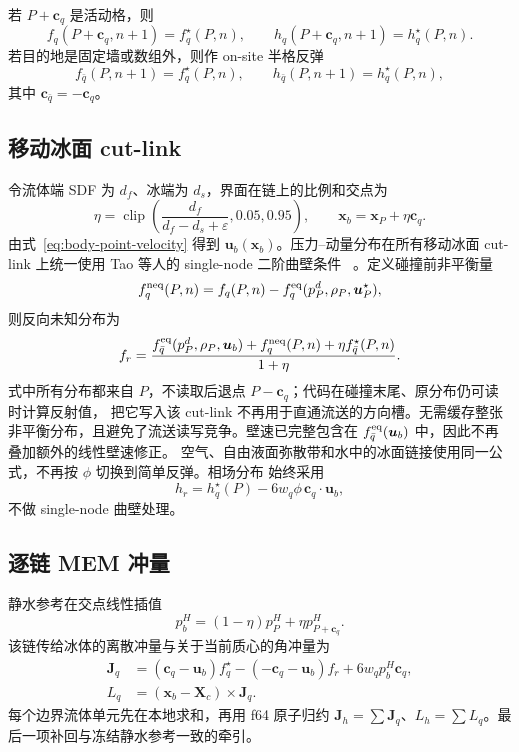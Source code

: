 \documentclass[UTF8,zihao=-4]{ctexart}
\newcommand{\vect}[1]{\boldsymbol{#1}}
\newcommand{\clip}{\operatorname{clip}}
\numberwithin{equation}{section}
\begin{document}
若 $P+\vect c_q$ 是活动格，则
\begin{equation}
  f_q(P+\vect c_q,n+1)=f_q^\star(P,n),
  \qquad h_q(P+\vect c_q,n+1)=h_q^\star(P,n).
\end{equation}
若目的地是固定墙或数组外，则作 on-site 半格反弹
\begin{equation}
  f_{\bar q}(P,n+1)=f_q^\star(P,n),
  \qquad h_{\bar q}(P,n+1)=h_q^\star(P,n),
\end{equation}
其中 $\vect c_{\bar q}=-\vect c_q$。

\subsection{移动冰面 cut-link}

令流体端 SDF 为 $d_f$、冰端为 $d_s$，界面在链上的比例和交点为
\begin{equation}
  \eta=\clip\left(\frac{d_f}{d_f-d_s+\varepsilon},0.05,0.95\right),
  \qquad \vect x_b=\vect x_P+\eta\vect c_q.
  \label{eq:cut-location}
\end{equation}
由式~\eqref{eq:body-point-velocity} 得到 $\vect u_b(\vect x_b)$。压力--动量分布在所有移动冰面
cut-link 上统一使用 Tao 等人的 single-node 二阶曲壁条件
~\cite{tao2018}。定义碰撞前非平衡量
\begin{equation}
  f_q^{\rm neq}(P,n)=f_q(P,n)-f_q^{\rm eq}(p^d_P,\rho_P,\vect u_P^\star),
\end{equation}
则反向未知分布为
\begin{equation}
  f_r=\frac{f_{\bar q}^{\rm eq}(p^d_P,\rho_P,\vect u_b)
  +f_q^{\rm neq}(P,n)+\eta f_{\bar q}^\star(P,n)}{1+\eta}.
  \label{eq:single-node-cut-link}
\end{equation}
式中所有分布都来自 $P$，不读取后退点 $P-\vect c_q$；代码在碰撞末尾、原分布仍可读时计算反射值，
把它写入该 cut-link 不再用于直通流送的方向槽。无需缓存整张非平衡分布，且避免了流送读写竞争。壁速已完整包含在
$f_{\bar q}^{\rm eq}(\vect u_b)$ 中，因此不再叠加额外的线性壁速修正。
空气、自由液面弥散带和水中的冰面链接使用同一公式，不再按 $\phi$ 切换到简单反弹。相场分布
始终采用
\begin{equation}
  h_r=h_q^\star(P)-6w_q\phi\,\vect c_q\cdot\vect u_b,
\end{equation}
不做 single-node 曲壁处理。

\subsection{逐链 MEM 冲量}

静水参考在交点线性插值
\begin{equation}
  p_b^H=(1-\eta)p_P^H+\eta p_{P+\vect c_q}^H.
\end{equation}
该链传给冰体的离散冲量与关于当前质心的角冲量为
\begin{align}
  \vect J_q&=(\vect c_q-\vect u_b)f_q^\star
  -(-\vect c_q-\vect u_b)f_r+6w_qp_b^H\vect c_q,\\
  L_q&=(\vect x_b-\vect X_c)\times\vect J_q.
  \label{eq:mem-link-impulse}
\end{align}
每个边界流体单元先在本地求和，再用 f64 原子归约
$\vect J_h=\sum\vect J_q$、$L_h=\sum L_q$。最后一项补回与冻结静水参考一致的牵引。
\end{document}
